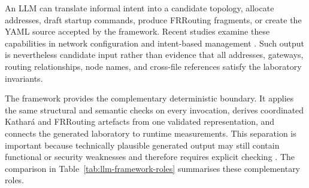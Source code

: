 An LLM can translate informal intent into a candidate topology, allocate
addresses, draft startup commands, produce FRRouting fragments, or create the
YAML source accepted by the framework. Recent studies examine these
capabilities in network configuration and intent-based management
\cite{wang2024netconfeval,lira2025llmnetcfg,liu2025llmnetworking}. Such output
is nevertheless candidate input rather than evidence that all addresses,
gateways, routing relationships, node names, and cross-file references satisfy
the laboratory invariants.

The framework provides the complementary deterministic boundary. It applies
the same structural and semantic checks on every invocation, derives
coordinated Kathar\'a and FRRouting artefacts from one validated representation,
and connects the generated laboratory to runtime measurements. This separation
is important because technically plausible generated output may still contain
functional or security weaknesses and therefore requires explicit checking
\cite{pearce2022copilotsecurity}. The comparison in
Table~\ref{tab:llm-framework-roles} summarises these complementary roles.

